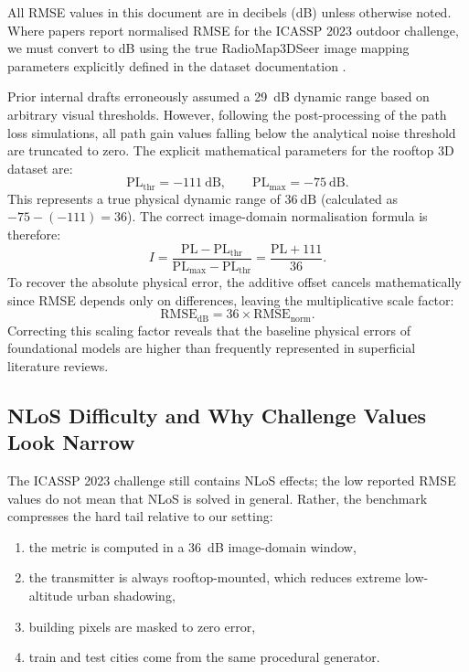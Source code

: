 \documentclass[11pt,a4paper]{article}
\begin{document}
All RMSE values in this document are in decibels (dB) unless otherwise noted.
Where papers report normalised RMSE for the ICASSP 2023 outdoor challenge, we must convert to dB using the true RadioMap3DSeer image mapping parameters explicitly defined in the dataset documentation \cite{dataset2212}. 

Prior internal drafts erroneously assumed a 29~dB dynamic range based on arbitrary visual thresholds. However, following the post-processing of the path loss simulations, all path gain values falling below the analytical noise threshold are truncated to zero. The explicit mathematical parameters for the rooftop 3D dataset are:
\[
    \mathrm{PL}_{\mathrm{thr}} = -111~\mathrm{dB}, \qquad
    \mathrm{PL}_{\max} = -75~\mathrm{dB}.
\]
This represents a true physical dynamic range of $36~\mathrm{dB}$ (calculated as $-75 - (-111) = 36$). The correct image-domain normalisation formula is therefore:
\begin{equation}
    I = \frac{\mathrm{PL} - \mathrm{PL}_{\mathrm{thr}}}
    {\mathrm{PL}_{\max} - \mathrm{PL}_{\mathrm{thr}}}
    = \frac{\mathrm{PL} + 111}{36}.
\end{equation}
To recover the absolute physical error, the additive offset cancels mathematically since RMSE depends only on differences, leaving the multiplicative scale factor:
\begin{equation}
    \mathrm{RMSE}_\mathrm{dB} = 36 \times \mathrm{RMSE}_\mathrm{norm}.
\end{equation}
Correcting this scaling factor reveals that the baseline physical errors of foundational models are higher than frequently represented in superficial literature reviews.

\subsection{NLoS Difficulty and Why Challenge Values Look Narrow}

The ICASSP 2023 challenge still contains NLoS effects; the low reported RMSE
values do not mean that NLoS is solved in general. Rather, the benchmark
compresses the hard tail relative to our setting:
\begin{enumerate}[nosep]
    \item the metric is computed in a 36~dB image-domain window,
    \item the transmitter is always rooftop-mounted, which reduces extreme
          low-altitude urban shadowing,
    \item building pixels are masked to zero error,
    \item train and test cities come from the same procedural generator.
\end{enumerate}
\end{document}
